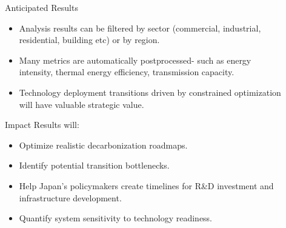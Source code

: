 \documentclass[final]{beamer}
\newlength{\sepwid}
\newlength{\onecolwid}
\newlength{\threecolwid}
\begin{document}
\begin{frame}[t]
\begin{columns}[t,totalwidth=\threecolwid]
\begin{column}{\onecolwid}
\begin{block}{Anticipated Results}

 \begin{itemize}
   \item Analysis results can be filtered by sector (commercial, industrial, residential, building etc) or by region.
   
   \item Many metrics are automatically postprocessed- such as energy intensity, thermal energy efficiency, transmission capacity. 
   
   \item Technology deployment transitions driven by constrained optimization will have valuable strategic value.    
 
 
 \end{itemize}  
 
 	
\end{block}







        \begin{alertblock}{Impact}
        \large Results will:
	\begin{itemize}
        \item {Optimize realistic decarbonization roadmaps.}
        \item {Identify potential transition bottlenecks.}
        \item {Help Japan's policymakers create timelines for R\&D investment and infrastructure development.}
        \item {Quantify system sensitivity to technology readiness.}
	\end{itemize}
        \end{alertblock}
   


\end{column} %

\begin{column}{\sepwid}\end{column} %

\begin{column}{\onecolwid} %


\end{column}
\end{columns}
\end{frame}
\end{document}
